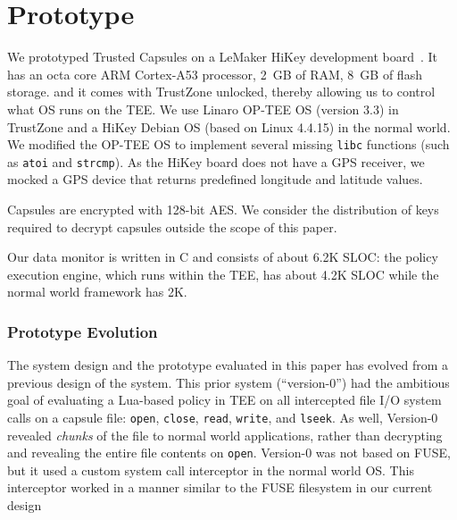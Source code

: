 \chapter{Prototype}
\label{sec:implement}

We prototyped Trusted Capsules on a LeMaker HiKey development
board~\cite{hikey}. It has an octa core ARM Cortex-A53 processor, 2~GB
of RAM, 8~GB of flash storage. and it comes with TrustZone unlocked,
thereby allowing us to control what OS runs on the TEE. We use Linaro
OP-TEE OS (version 3.3) in TrustZone and a HiKey Debian OS (based on
Linux 4.4.15) in the normal world. We modified the OP-TEE OS to
implement several missing {\tt libc} functions (such as {\tt atoi} and
{\tt strcmp}). As the HiKey board does not have a GPS receiver, we
mocked a GPS device that returns predefined longitude and latitude
values.

Capsules are encrypted with 128-bit AES. We consider the distribution
of keys required to decrypt capsules outside the scope of this paper.

Our data monitor is written in C and consists of about 6.2K SLOC: the
policy execution engine, which runs within the TEE, has about 4.2K
SLOC while the normal world framework has 2K.

\subsection{Prototype Evolution}\label{sub:proto-prototype}

The system design and the prototype evaluated in this paper has
evolved from a previous design of the system. This prior system
(``version-0'') had the ambitious goal of evaluating a Lua-based
policy in TEE on all intercepted file I/O system calls on a capsule
file: \texttt{open}, \texttt{close}, \texttt{read}, \texttt{write},
and \texttt{lseek}. As well, Version-0 revealed \emph{chunks} of the
file to normal world applications, rather than decrypting and
revealing the entire file contents on \texttt{open}. Version-0 was not
based on FUSE, but it used a custom system call interceptor in the
normal world OS. This interceptor worked in a manner similar to the
FUSE filesystem in our current design

